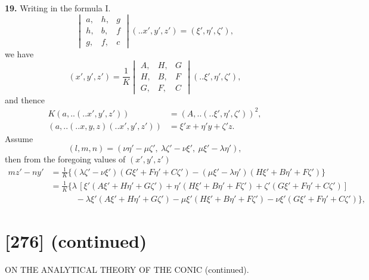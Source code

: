\documentclass[12pt,a4paper]{article}
\newcommand{\qform}[2]{(#1 \mathbin{..} #2)}
\theoremstyle{definition}
\begin{document}
\textbf{19.} Writing in the formula I.
\[
\begin{vmatrix}
a, & h, & g \\
h, & b, & f \\
g, & f, & c
\end{vmatrix}
\!\qform{}{x', y', z'} = (\xi', \eta', \zeta'),
\]
we have
\[
(x', y', z') = \frac{1}{K}
\begin{vmatrix}
A, & H, & G \\
H, & B, & F \\
G, & F, & C
\end{vmatrix}
\!\qform{}{\xi', \eta', \zeta'},
\]
and thence
\begin{align*}
K(a,..\!\qform{}{x', y', z'}) &= (A,..\!\qform{}{\xi', \eta', \zeta'})^{2},\\
(a,..\!\qform{}{x, y, z}\!\qform{}{x', y', z'}) &= \xi'x + \eta'y + \zeta'z.
\end{align*}
Assume
\[
(l, m, n) = (\nu\eta' - \mu\zeta',\ \lambda\zeta' - \nu\xi',\ \mu\xi' - \lambda\eta'),
\]
then from the foregoing values of $(x', y', z')$
\begin{align*}
mz' - ny' &= \frac{1}{K}\Big\{ (\lambda\zeta' - \nu\xi')(G\xi' + F\eta' + C\zeta')
- (\mu\xi' - \lambda\eta')(H\xi' + B\eta' + F\zeta') \Big\}\\
&= \frac{1}{K}\Big\{ \lambda\, [\xi'(A\xi' + H\eta' + G\zeta')
+ \eta'(H\xi' + B\eta' + F\zeta')
+ \zeta'(G\xi' + F\eta' + C\zeta')]\\
&\qquad\quad - \lambda\xi'(A\xi' + H\eta' + G\zeta')
- \mu\xi'(H\xi' + B\eta' + F\zeta')
- \nu\xi'(G\xi' + F\eta' + C\zeta') \Big\},
\end{align*}

\newpage
\section*{[276] (continued)}
\begin{center}
{\large ON THE ANALYTICAL THEORY OF THE CONIC (continued).}
\end{center}
\end{document}
